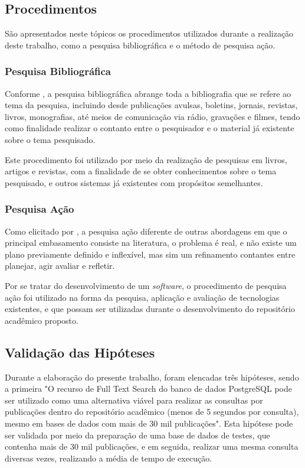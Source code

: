 \subsection{Procedimentos}

São apresentados neste tópicos os procedimentos utilizados
durante a realização deste trabalho, como a pesquisa bibliográfica e
o método de pesquisa ação.

\subsubsection{Pesquisa Bibliográfica}

Conforme \citep[p. 183]{LAKATOS:metodologia}, a pesquisa bibliográfica
abrange toda a bibliografia que se refere ao tema da pesquisa,
incluindo desde publicações avulsas, boletins, jornais, revistas,
livros, monografias, até meios de comunicação via rádio,
gravações e filmes, tendo como finalidade realizar o contanto
entre o pesquisador e o material já existente sobre o tema pesquisado.

Este procedimento foi utilizado por meio da realização de pesquisas
em livros, artigos e revistas, com a finalidade de se obter
conhecimentos sobre o tema pesquisado, e outros sistemas
já existentes com propósitos semelhantes.

\subsubsection{Pesquisa Ação}

Como elicitado por \citep[p. 45]{LOVATO:metodologia}, a pesquisa ação
diferente de outras abordagens em que o principal
embasamento consiste na literatura, o problema é real, e não existe
um plano previamente definido e inflexível, mas sim um refinamento
contantes entre planejar, agir avaliar e refletir.

Por se tratar do desenvolvimento de um \emph{software}, o procedimento
de pesquisa ação foi utilizado na forma da pesquisa,
aplicação e avaliação de tecnologias existentes, e que possam
ser utilizadas durante o desenvolvimento do repositório
acadêmico proposto.

\subsection{Validação das Hipóteses}

Durante a elaboração do presente trabalho, foram elencadas
três hipóteses, sendo a  primeira "O recurso de Full Text
Search do banco de dados PostgreSQL pode ser utilizado como
uma alternativa viável para realizar as consultas por publicações
dentro do repositório acadêmico (menos de 5 segundos por consulta),
mesmo em bases de dados com mais de 30 mil publicações".
Esta hipótese pode ser validada por meio da preparação de uma base
de dados de testes, que contenha mais de 30 mil publicações, e
em seguida, realizar uma mesma consulta diversas vezes, realizando
a média de tempo de execução.


